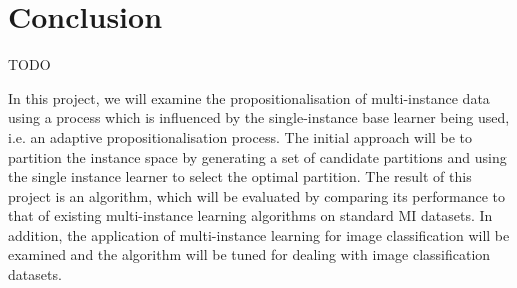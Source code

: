 \documentclass[a4paper,12pt]{article} %
\begin{document}
\section{Conclusion}
TODO

In this project, we will examine the propositionalisation of multi-instance data using a process which is influenced by the single-instance base learner being used, i.e. an adaptive propositionalisation process. The initial approach will be to partition the instance space by generating a set of candidate partitions and using the single instance learner to select the optimal partition. 
The result of this project is an algorithm, which will be evaluated by comparing its performance to that of existing multi-instance learning algorithms on standard MI datasets. 
In addition, the application of multi-instance learning for image classification will be examined and the algorithm will be tuned for dealing with image classification datasets.
\clearpage
 

\end{document}
